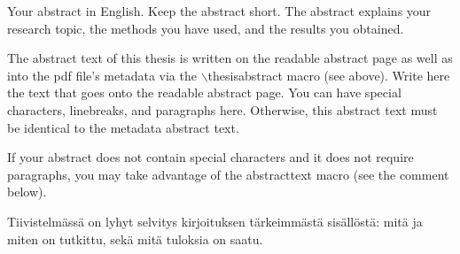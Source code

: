 \documentclass[english, 12pt, a4paper, elec, utf8, a-1b, online]{aaltothesis}
\date{31.8.2018}
\begin{document}
\makecoverpage

\makecopyrightpage


\begin{abstractpage}[english]
  Your abstract in English. Keep the abstract short. The abstract explains your
  research topic, the methods you have used, and the results you obtained.  
  
  The abstract text of this thesis is written on the readable abstract page as
  well as into the pdf file's metadata via the $\backslash$thesisabstract macro
  (see above). Write here the text that goes onto the readable abstract page.
  You can have special characters, linebreaks, and paragraphs here. Otherwise,
  this abstract text must be identical to the metadata abstract text.
  
  If your abstract does not contain special characters and it does not require
  paragraphs, you may take advantage of the abstracttext macro (see the comment
  below).
\end{abstractpage}


\newpage
\begin{abstractpage}[finnish]
  Tiivistelmässä on lyhyt selvitys
  kirjoituksen tärkeimmästä sisällöstä: mitä ja miten on tutkittu,
  sekä mitä tuloksia on saatu. 
\end{abstractpage}
\end{document}
